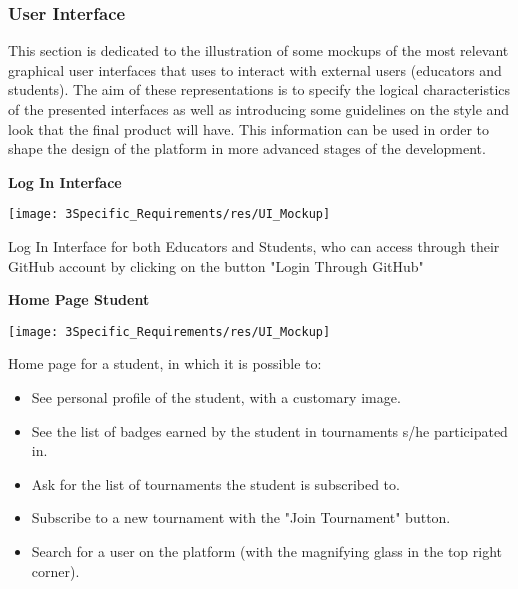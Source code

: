 \subsubsection{User Interface}
This section is dedicated to the illustration of some mockups of the most relevant graphical user interfaces that \app uses to interact with external users (educators and students). 
The aim of these representations is to specify the logical characteristics of the presented interfaces as well as introducing some guidelines on the style and look that the final product will have. This information can be used in order to shape the design of the \app platform in more advanced stages of the development.
 
\vspace{1cm}

\begin{minipage}{\linewidth}
	\textbf{Log In Interface}
  \begin{center}
  \texttt{[image: 3Specific\_Requirements/res/UI\_Mockup]}

  \end{center}
    Log In Interface for both Educators and Students, who can access \app through their GitHub account by clicking on the button "Login Through GitHub"
\end{minipage}

\vspace{1cm}

\begin{minipage}{\linewidth}
	\textbf{Home Page Student}
	\begin{center}
		\texttt{[image: 3Specific\_Requirements/res/UI\_Mockup]}
		
	\end{center}
	Home page for a student, in which it is possible to:
	\begin{itemize}
		\item See personal profile of the student, with a customary image.
		\item See the list of badges earned by the student in tournaments s/he participated in.
		\item Ask for the list of tournaments the student is subscribed to.
		\item Subscribe to a new tournament with the "Join Tournament" button.
		\item Search for a user on the platform (with the magnifying glass in the top right corner). 
	\end{itemize}
\end{minipage}

